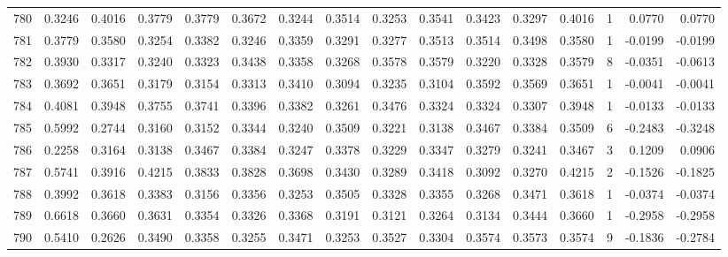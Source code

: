 \begin{tabular}{lrrrrrrrrrrrrrrr}
780 &      0.3246 &  0.4016 &  0.3779 &  0.3779 &  0.3672 &  0.3244 &  0.3514 &  0.3253 &  0.3541 &  0.3423 &   0.3297 &     0.4016 &      1 &                    0.0770 &                     0.0770 \\
781 &      0.3779 &  0.3580 &  0.3254 &  0.3382 &  0.3246 &  0.3359 &  0.3291 &  0.3277 &  0.3513 &  0.3514 &   0.3498 &     0.3580 &      1 &                   -0.0199 &                    -0.0199 \\
782 &      0.3930 &  0.3317 &  0.3240 &  0.3323 &  0.3438 &  0.3358 &  0.3268 &  0.3578 &  0.3579 &  0.3220 &   0.3328 &     0.3579 &      8 &                   -0.0351 &                    -0.0613 \\
783 &      0.3692 &  0.3651 &  0.3179 &  0.3154 &  0.3313 &  0.3410 &  0.3094 &  0.3235 &  0.3104 &  0.3592 &   0.3569 &     0.3651 &      1 &                   -0.0041 &                    -0.0041 \\
784 &      0.4081 &  0.3948 &  0.3755 &  0.3741 &  0.3396 &  0.3382 &  0.3261 &  0.3476 &  0.3324 &  0.3324 &   0.3307 &     0.3948 &      1 &                   -0.0133 &                    -0.0133 \\
785 &      0.5992 &  0.2744 &  0.3160 &  0.3152 &  0.3344 &  0.3240 &  0.3509 &  0.3221 &  0.3138 &  0.3467 &   0.3384 &     0.3509 &      6 &                   -0.2483 &                    -0.3248 \\
786 &      0.2258 &  0.3164 &  0.3138 &  0.3467 &  0.3384 &  0.3247 &  0.3378 &  0.3229 &  0.3347 &  0.3279 &   0.3241 &     0.3467 &      3 &                    0.1209 &                     0.0906 \\
787 &      0.5741 &  0.3916 &  0.4215 &  0.3833 &  0.3828 &  0.3698 &  0.3430 &  0.3289 &  0.3418 &  0.3092 &   0.3270 &     0.4215 &      2 &                   -0.1526 &                    -0.1825 \\
788 &      0.3992 &  0.3618 &  0.3383 &  0.3156 &  0.3356 &  0.3253 &  0.3505 &  0.3328 &  0.3355 &  0.3268 &   0.3471 &     0.3618 &      1 &                   -0.0374 &                    -0.0374 \\
789 &      0.6618 &  0.3660 &  0.3631 &  0.3354 &  0.3326 &  0.3368 &  0.3191 &  0.3121 &  0.3264 &  0.3134 &   0.3444 &     0.3660 &      1 &                   -0.2958 &                    -0.2958 \\
790 &      0.5410 &  0.2626 &  0.3490 &  0.3358 &  0.3255 &  0.3471 &  0.3253 &  0.3527 &  0.3304 &  0.3574 &   0.3573 &     0.3574 &      9 &                   -0.1836 &                    -0.2784 \\

\end{tabular}
